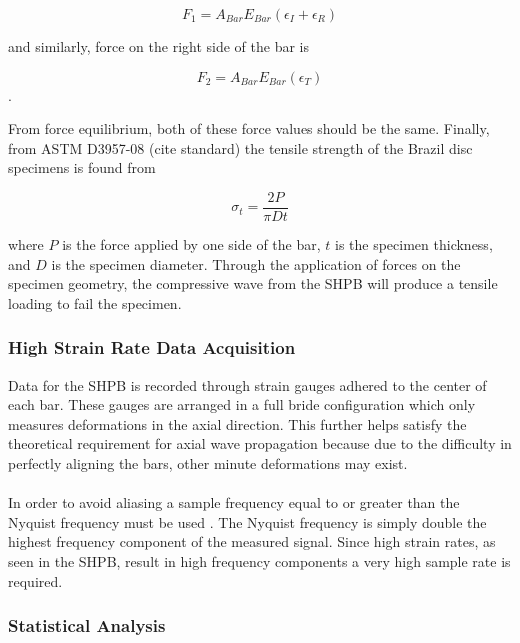 \documentclass[12pt]{article}
\begin{document}
\begin{equation}
F_1 = A_{Bar}E_{Bar}(\epsilon_I + \epsilon_R)
\end{equation}

and similarly, force on the right side of the bar is

\begin{equation}
F_2 = A_{Bar}E_{Bar}(\epsilon_T)
\end{equation}.

From force equilibrium, both of these force values should be the same. Finally, from ASTM D3957-08 (cite standard) the tensile strength of the Brazil disc specimens is found from

\begin{equation}
\sigma_t = \frac{2P}{\pi Dt}
\end{equation}

where $P$ is the force applied by one side of the bar, $t$ is the specimen thickness, and $D$ is the specimen diameter. Through the application of forces on the specimen geometry, the compressive wave from the SHPB will produce a tensile loading to fail the specimen.

\subsubsection{High Strain Rate Data Acquisition} %
Data for the SHPB is recorded through strain gauges adhered to the center of each bar. These gauges are arranged in a full bride configuration which only measures deformations in the axial direction. This further helps satisfy the theoretical requirement for axial wave propagation because due to the difficulty in perfectly aligning the bars, other minute deformations may exist.
\\ \\
In order to avoid aliasing a sample frequency equal to or greater than the Nyquist frequency must be used \cite{Shukla} \cite{Sampling}. The Nyquist frequency is simply double the highest frequency component of the measured signal. Since high strain rates, as seen in the SHPB, result in high frequency components a very high sample rate is required. 

\subsubsection{Statistical Analysis} %
\end{document}
